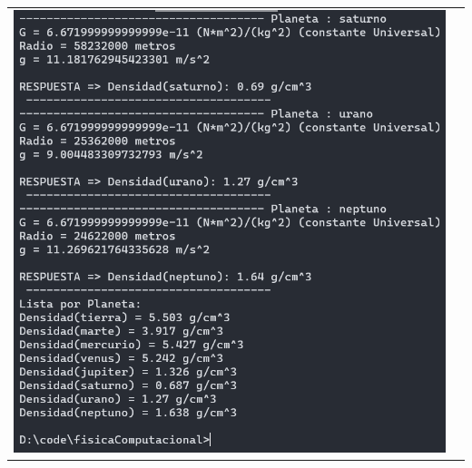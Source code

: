\documentclass[a4paper,12pt]{article}
\begin{document}
\begin{table}[htbp]
\begin{tabular}{cc}
\begin{minipage}{.3\textwidth}
                \includegraphics[width=\linewidth]{e2_2}
            \end{minipage}
        \end{tabular}
    \end{table}
\end{document}
